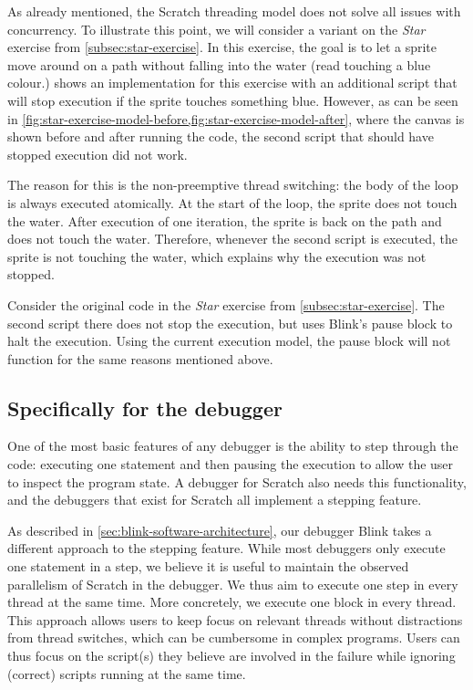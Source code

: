 \documentclass[../main]{subfiles}
\begin{document}
As \citeauthor{maloneyScratchProgrammingLanguage2010a} already mentioned, the Scratch threading model does not solve all issues with concurrency.
To illustrate this point, we will consider a variant on the \emph{Star} exercise from \cref{subsec:star-exercise}.
In this exercise, the goal is to let a sprite move around on a path without falling into the water (read touching a blue colour.)
 shows an implementation for this exercise with an additional script that will stop execution if the sprite touches something blue.
However, as can be seen in \cref{fig:star-exercise-model-before,fig:star-exercise-model-after}, where the canvas is shown before and after running the code, the second script that should have stopped execution did not work.

The reason for this is the non-preemptive thread switching: the body of the loop is always executed atomically.
At the start of the loop, the sprite does not touch the water.
After execution of one iteration, the sprite is back on the path and does not touch the water.
Therefore, whenever the second script is executed, the sprite is not touching the water, which explains why the execution was not stopped.

Consider the original code in the \emph{Star} exercise from \cref{subsec:star-exercise}.
The second script there does not stop the execution, but uses Blink's pause block to halt the execution.
Using the current execution model, the pause block will not function for the same reasons mentioned above.

\subsection{Specifically for the debugger}\label{subsec:specifically-for-the-debugger}

One of the most basic features of any debugger is the ability to step through the code: executing one statement and then pausing the execution to allow the user to inspect the program state.
A debugger for Scratch also needs this functionality, and the debuggers that exist for Scratch all implement a stepping feature.

As described in \cref{sec:blink-software-architecture}, our debugger Blink takes a different approach to the stepping feature.
While most debuggers only execute one statement in a step, we believe it is useful to maintain the observed parallelism of Scratch in the debugger.
We thus aim to execute one step in every thread at the same time.
More concretely, we execute one block in every thread.
This approach allows users to keep focus on relevant threads without distractions from thread switches, which can be cumbersome in complex programs.
Users can thus focus on the script(s) they believe are involved in the failure while ignoring (correct) scripts running at the same time.
\end{document}
